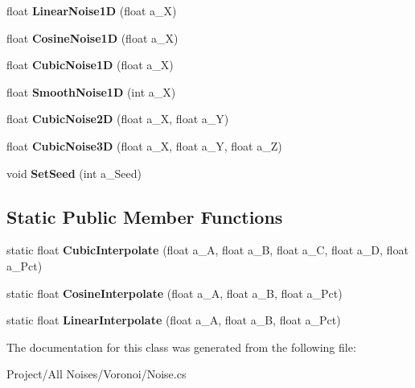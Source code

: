 \begin{DoxyCompactItemize}
\item 
\mbox{\label{classc_noise_a48136470889e5bc9f8e16b1ff63c7e05}} 
float {\bfseries Linear\+Noise1D} (float a\+\_\+X)
\item 
\mbox{\label{classc_noise_aa36f7df39e715c681d3ca671013e13ca}} 
float {\bfseries Cosine\+Noise1D} (float a\+\_\+X)
\item 
\mbox{\label{classc_noise_a4fc360258a7d3a50bd7d9e31e702aaee}} 
float {\bfseries Cubic\+Noise1D} (float a\+\_\+X)
\item 
\mbox{\label{classc_noise_ae4539eab0205aa7bacf824005c0307c5}} 
float {\bfseries Smooth\+Noise1D} (int a\+\_\+X)
\item 
\mbox{\label{classc_noise_a08a8796a5bea2465cd67957313d770eb}} 
float {\bfseries Cubic\+Noise2D} (float a\+\_\+X, float a\+\_\+Y)
\item 
\mbox{\label{classc_noise_af570557a7a32b66b8ecd9a7733d8d0bf}} 
float {\bfseries Cubic\+Noise3D} (float a\+\_\+X, float a\+\_\+Y, float a\+\_\+Z)
\item 
\mbox{\label{classc_noise_a11e29092b7f84b68dce9dc2a1c951e8b}} 
void {\bfseries Set\+Seed} (int a\+\_\+\+Seed)
\end{DoxyCompactItemize}
\subsection*{Static Public Member Functions}
\begin{DoxyCompactItemize}
\item 
\mbox{\label{classc_noise_a9624304fdaa79f7e9f74d72441974404}} 
static float {\bfseries Cubic\+Interpolate} (float a\+\_\+A, float a\+\_\+B, float a\+\_\+C, float a\+\_\+D, float a\+\_\+\+Pct)
\item 
\mbox{\label{classc_noise_a5df3de6b8f68a6937ec971c352edbd89}} 
static float {\bfseries Cosine\+Interpolate} (float a\+\_\+A, float a\+\_\+B, float a\+\_\+\+Pct)
\item 
\mbox{\label{classc_noise_aa3e800efc296cdce2ab8efad8bdbb4c0}} 
static float {\bfseries Linear\+Interpolate} (float a\+\_\+A, float a\+\_\+B, float a\+\_\+\+Pct)
\end{DoxyCompactItemize}


The documentation for this class was generated from the following file\+:\begin{DoxyCompactItemize}
\item 
Project/\+All Noises/\+Voronoi/Noise.\+cs\end{DoxyCompactItemize}
